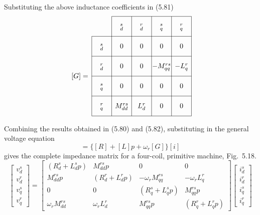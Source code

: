 \documentclass[a4paper,numbers=noenddot,12pt]{scrbook}
\begin{document}
Substituting the above inductance coefficients in (5.81)
\begin{equation}
    \begin{tikzpicture} [anchor = base, baseline =0pt]
        \draw (0,0)--(5,0) (0,1)--(5,1) (0,2)--(5,2) (1,3)--(5,3) (0,-1)--(5,-1) (0,-2)--(5,-2);
        \draw (0,-2)--(0,2) (1,-2)--(1,3) (2,-2)--(2,3) (3,-2)--(3,3) (4,-2)--(4,3) (5,-2)--(5,3);
        \draw (0.5,-1.6) node{$_q^r$} +(0,1) node{$_q^s$} +(0,2) node{$_d^r$} +(0,3) node{$_d^s$};
        \draw (1.5,-1.6) node{$M_{dd}^{rs}$} +(0,1) node{0} +(0,2) node{0} +(0,3) node{0}+(0,4) node{$_d^s$};
        \draw (2.5,-1.6) node{$L_{d}^{r}$} +(0,1) node{0} +(0,2) node{0} +(0,3) node{0}+(0,4) node{$_d^r$};
        \draw (3.5,-1.6) node{0} +(0,1) node{0} +(0,2) node{$-M_{qq}^{rs}$} +(0,3) node{0}+(0,4) node{$_q^s$};
        \draw (4.5,-1.6) node{0} +(0,1) node{0} +(0,2) node{$-L_{q}^{r}$} +(0,3) node{0}+(0,4) node{$_q^r$};
        \draw (-0.6,-0.1) node{$[G] =$};
    \end{tikzpicture}
\end{equation}

Combining the results obtained in (5.80) and (5.82), substituting in the general voltage equation
\begin{equation*}
    [v] = \{[R] + [L]p+\omega_r[G]\}[i]
\end{equation*}
gives the complete impedance matrix for a four-coil, primitive machine, Fig.\ 5.18.
\begin{equation}
    \begin{bmatrix}
        v_d^s \\ v_d^r \\ v_q^s \\ v_q^r
    \end{bmatrix}
    =
    \begin{bmatrix}
        (R_d^s + L_d^s p) & M_{dd}^{rs}p & 0 & 0\\
        M_{dd}^{rs}p & (R_d^r + L_d^r p) & -\omega_r M_{qq}^{rs} &-\omega_r L_q^r \\
        0 & 0 & (R_q^s + L_q^s p) & M_{qq}^{rs} p \\
        \omega_r M_{dd}^{rs} & \omega_r L_{d}^{r} & M_{qq}^{rs} p & (R_q^r + L_q^r p)
    \end{bmatrix}
    \begin{bmatrix}
        i_d^s \\ i_d^r \\ i_q^s \\ i_q^r
    \end{bmatrix}
\end{equation}
\end{document}
